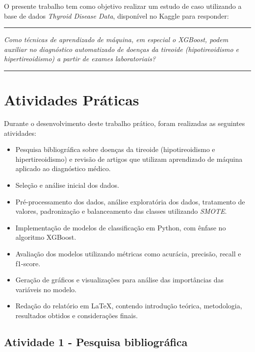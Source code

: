 \documentclass[11pt]{article}
\newcommand{\HRule}[1]{\rule{\linewidth}{#1}}
\begin{document}
O presente trabalho tem como objetivo realizar um estudo de caso utilizando a base de dados \textit{Thyroid Disease Data}, disponível no Kaggle \cite{thyroid-dataset} para responder:


\par\noindent\rule{\textwidth}{0.4pt}
\begin{center}
    \textit{Como técnicas de aprendizado de máquina, em especial o XGBoost, podem auxiliar no diagnóstico automatizado de doenças da tireoide (hipotireoidismo e hipertireoidismo) a partir de exames laboratoriais?}
\end{center}
\par\noindent\rule{\textwidth}{0.4pt}

 
\section{Atividades Práticas}

Durante o desenvolvimento deste trabalho prático, foram realizadas as seguintes atividades:

\begin{itemize}
    \item Pesquisa bibliográfica sobre doenças da tireoide (hipotireoidismo e hipertireoidismo) e revisão de artigos que utilizam aprendizado de máquina aplicado ao diagnóstico médico.
    \item Seleção e análise inicial dos dados.
    \item Pré-processamento dos dados, análise exploratória dos dados, tratamento de valores, padronização e balanceamento das classes utilizando \textit{SMOTE}.
    \item Implementação de modelos de classificação em Python, com ênfase no algoritmo XGBoost.
    \item Avaliação dos modelos utilizando métricas como acurácia, precisão, recall e f1-score.
    \item Geração de gráficos e visualizações para análise das importâncias das variáveis no modelo.
    \item Redação do relatório em \LaTeX, contendo introdução teórica, metodologia, resultados obtidos e considerações finais.
\end{itemize}

\subsection{Atividade 1 - Pesquisa bibliográfica}
\end{document}
